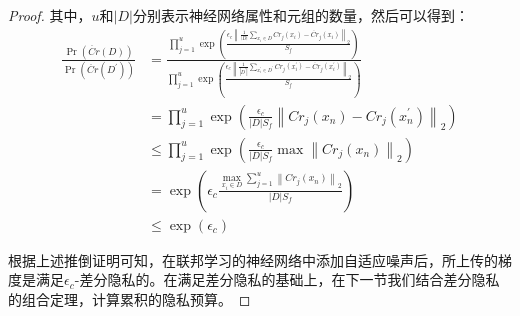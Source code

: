 \begin{proof}
其中，$u$和$|D|$分别表示神经网络属性和元组的数量，然后可以得到：
\begin{equation}\label{贡献数量和元组}
\begin{aligned}
\frac{\operatorname{Pr}(\ddot{Cr}(D))}{\operatorname{Pr}\left(\ddot{Cr}\left(D^{\prime}\right)\right)} &=\frac{\prod_{j=1}^{u} \exp \left(\frac{\epsilon_{c}\left\|\frac{1}{|D|} \sum_{x_{i} \in D} Cr_{j}\left(x_{i}\right)-\ddot{Cr}_{j}\left(x_{i}\right)\right\|_{2}}{S_{f}}\right)}{\prod_{j=1}^{u} \exp \left(\frac{\epsilon_{c}\left\|\frac{1}{\left|D^{\prime}\right|} \sum_{x_{i}^{\prime} \in D^{\prime}} Cr_{j}\left(x_{i}^{\prime}\right)-\ddot{Cr}_{j}\left(x_{i}^{\prime}\right)\right\|_{2}}{S_{f}}\right)} \\
&=\prod_{j=1}^{u} \exp \left(\frac{\epsilon_{c}}{|D| S_{f}}\left\|Cr_{j}\left(x_{n}\right)-Cr_{j}\left(x_{n}^{\prime}\right)\right\|_{2}\right) \\
& \leq \prod_{j=1}^{u} \exp \left(\frac{\epsilon_{c}}{|D| S_{f}} \max \left\|Cr_{j}\left(x_{n}\right)\right\|_{2}\right) \\
&=\exp \left(\epsilon_{c} \frac{\max _{x_{i} \in D} \sum_{j=1}^{u}\left\|Cr_{j}\left(x_{n}\right)\right\|_{2}}{|D| S_{f}}\right) \\
& \leq \exp \left(\epsilon_{c}\right)
\end{aligned}
\end{equation}

根据上述推倒证明可知，在联邦学习的神经网络中添加自适应噪声后，所上传的梯度是满足$\epsilon_{c}$-差分隐私的。在满足差分隐私的基础上，在下一节我们结合差分隐私的组合定理，计算累积的隐私预算。
\end{proof}



